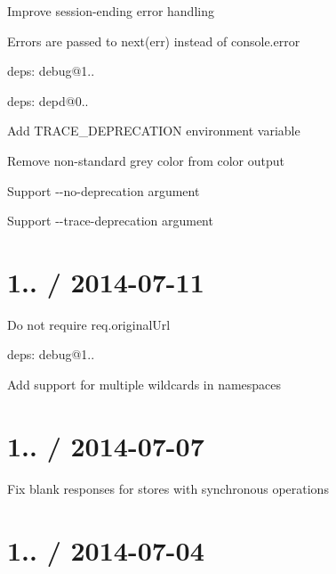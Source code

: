 \begin{DoxyItemize}
\item Improve session-\/ending error handling
\begin{DoxyItemize}
\item Errors are passed to {\ttfamily next(err)} instead of {\ttfamily console.\+error}
\end{DoxyItemize}
\item deps\+: debug@1..
\item deps\+: depd@0..
\begin{DoxyItemize}
\item Add {\ttfamily T\+R\+A\+C\+E\+\_\+\+D\+E\+P\+R\+E\+C\+A\+T\+I\+ON} environment variable
\item Remove non-\/standard grey color from color output
\item Support {\ttfamily -\/-\/no-\/deprecation} argument
\item Support {\ttfamily -\/-\/trace-\/deprecation} argument
\end{DoxyItemize}
\end{DoxyItemize}

\section*{1.. / 2014-\/07-\/11 }


\begin{DoxyItemize}
\item Do not require {\ttfamily req.\+original\+Url}
\item deps\+: debug@1..
\begin{DoxyItemize}
\item Add support for multiple wildcards in namespaces
\end{DoxyItemize}
\end{DoxyItemize}

\section*{1.. / 2014-\/07-\/07 }


\begin{DoxyItemize}
\item Fix blank responses for stores with synchronous operations
\end{DoxyItemize}

\section*{1.. / 2014-\/07-\/04 }


